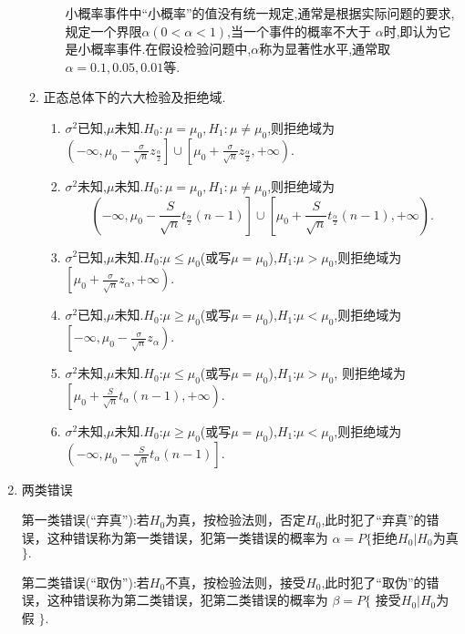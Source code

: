 \begin{enumerate}
\begin{enumerate}
\begin{enumerate}
                                    小概率事件中“小概率”的值没有统一规定,通常是根据实际问题的要求,规定一个界限$\alpha(0<\alpha<1)$,当一个事件的概率不大于 $\alpha$时,即认为它是小概率事件.在假设检验问题中,$\alpha$称为显著性水平,通常取$\alpha=0.1,0.05,0.01$等.
                        \end{enumerate}
                  \item 正态总体下的六大检验及拒绝域.
                        \begin{enumerate}
                              \item $\sigma^2$已知,$\mu$未知.$H_0:\mu=\mu_0,H_1:\mu\neq\mu_0$,则拒绝域为$\left(-\infty,\mu_{0}-\frac{\sigma}{\sqrt{n}}z_{\frac{\alpha}{2}}\right]\cup\left[\mu_{0}+\frac{\sigma}{\sqrt{n}}z_{\frac{\alpha}{2}},+\infty\right)$.
                              \item $\sigma^2$未知,$\mu$未知.$H_0:\mu=\mu_0,H_1:\mu\neq\mu_0$,则拒绝域为
                                    $$\left(-\infty,\mu_0-\frac{S}{\sqrt{n}}t_{\frac{\alpha}{2}}(n-1)\right]\cup\left[\mu_0+\frac{S}{\sqrt{n}}t_{\frac{\alpha}{2}}(n-1),+\infty\right).$$
                              \item $\sigma^{2}$已知,$\mu$未知.$H_{0}$:$\mu\leqslant\mu_{0}$(或写$\mu=\mu_{0}$),$H_{1}$:$\mu>\mu_{0}$,则拒绝域为$\left[\mu_{0}+\frac{\sigma}{\sqrt{n}}z_{\alpha},+\infty\right)$.
                              \item $\sigma^{2}$已知,$\mu$未知.$H_{0}$:$\mu\geqslant\mu_{0}$(或写$\mu=\mu_{0}$),$H_{1}$:$\mu<\mu_{0}$,则拒绝域为$\left[-\infty,\mu_{0}-\frac{\sigma}{\sqrt{n}}z_{\alpha}\right)$.
                              \item $\sigma^{2}$未知,$\mu$未知.$H_{0}$:$\mu\leqslant\mu_{0}$(或写$\mu=\mu_{0}$),$H_{1}$:$\mu>\mu_{0}$, 则拒绝域为$\left[\mu_{0}+\frac{S}{\sqrt{n}}t_{\alpha}(n-1),+\infty\right)$.
                              \item $\sigma^{2}$未知,$\mu$未知.$H_{0}$:$\mu\geqslant\mu_{0}$(或写$\mu=\mu_{0}$),$H_{1}$:$\mu<\mu_{0}$,则拒绝域为$\left(-\infty,\mu_{0}-\frac{S}{\sqrt{n}}t_{\alpha}(n-1)\right]$.
                        \end{enumerate}
            \end{enumerate}
      \item 两类错误

            第一类错误(“弃真”):若$H_0$为真，按检验法则，否定$H_{0}$,此时犯了“弃真”的错误，这种错误称为第一类错误，犯第一类错误的概率为 $\alpha=P\{$拒绝$H_0|H_0$为真 $\}.$

            第二类错误(“取伪”):若$H_0$不真，按检验法则，接受$H_0$,此时犯了“取伪”的错误，这种错误称为第二类错误，犯第二类错误的概率为 $\beta=P\{$ 接受$H_0|H_0$为假 $\}.$
\end{enumerate}


